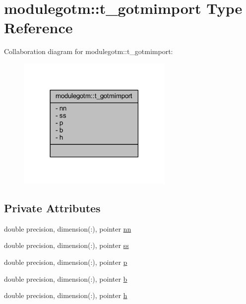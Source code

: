 \hypertarget{structmodulegotm_1_1t__gotmimport}{}\section{modulegotm\+:\+:t\+\_\+gotmimport Type Reference}
\label{structmodulegotm_1_1t__gotmimport}


Collaboration diagram for modulegotm\+:\+:t\+\_\+gotmimport\+:\nopagebreak
\begin{figure}[H]
\begin{center}
\leavevmode
\includegraphics[width=213pt]{structmodulegotm_1_1t__gotmimport__coll__graph}
\end{center}
\end{figure}
\subsection*{Private Attributes}
\begin{DoxyCompactItemize}
\item 
double precision, dimension(\+:), pointer \mbox{\hyperlink{structmodulegotm_1_1t__gotmimport_a97a0def9950edb46af6efe2cb830c5e9}{nn}}
\item 
double precision, dimension(\+:), pointer \mbox{\hyperlink{structmodulegotm_1_1t__gotmimport_a2111c50b582ead8cc49705b5d26ac827}{ss}}
\item 
double precision, dimension(\+:), pointer \mbox{\hyperlink{structmodulegotm_1_1t__gotmimport_ada042cfbce88af7686b5442d4426a16c}{p}}
\item 
double precision, dimension(\+:), pointer \mbox{\hyperlink{structmodulegotm_1_1t__gotmimport_aca2a732ae324aae0d1ccf62cf4b27a7b}{b}}
\item 
double precision, dimension(\+:), pointer \mbox{\hyperlink{structmodulegotm_1_1t__gotmimport_af3e74312d3e65ec3da8d0bf38d93759a}{h}}
\end{DoxyCompactItemize}


